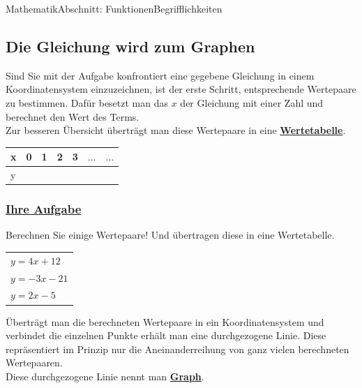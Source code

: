 \documentclass[11pt,twocolumn,oneside,openany,headings=optiontotoc,11pt,numbers=noenddot]{article}
\begin{document}
\begin{worksheet}{Mathematik}{Abschnitt: Funktionen}{Begrifflichkeiten}
		\subsection{Die Gleichung wird zum Graphen}
		Sind Sie mit der Aufgabe konfrontiert eine gegebene Gleichung in einem Koordinatensystem einzuzeichnen, ist der erste Schritt, entsprechende Wertepaare zu bestimmen. Dafür besetzt man das \(x\) der Gleichung mit einer Zahl und berechnet den Wert des Terms.\\
		Zur besseren Übersicht überträgt man diese Wertepaare in eine \textbf{\underline{Wertetabelle}}.\\
		\begin{tabularx}{0.45\textwidth}{|X|X|X|X|X|X|X|}
			\hline
			x & 0 & 1 & 2 & 3 & \(\ldots\) & \(\ldots\)\\
			\hline
			y & & & & & & \\
			\hline
		\end{tabularx}
		\subsubsection*{\underline{Ihre Aufgabe}} Berechnen Sie einige Wertepaare! Und übertragen diese in eine Wertetabelle.
		\begin{tabularx}{0.45\textwidth}{X}
			\(y = 4x + 12\)\\
			\(y = -3x - 21\)\\
			\(y = 2x - 5\)
		\end{tabularx}
		\par\bigskip\noindent
		Überträgt man die berechneten Wertepaare in ein Koordinatensystem und verbindet die einzelnen Punkte erhält man eine durchgezogene Linie. Diese repräsentiert im Prinzip nur die Aneinanderreihung von ganz vielen berechneten Wertepaaren.\\
		Diese durchgezogene Linie nennt man \underline{\textbf{Graph}}.

\end{worksheet}
\end{document}
